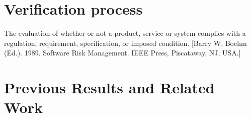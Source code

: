\section{Verification process}

The evaluation of whether or not a product, service or system complies with a regulation, requirement, specification, or imposed condition. [Barry W. Boehm (Ed.). 1989. Software Risk Management. IEEE Press, Piscataway, NJ, USA.]

\section{Previous Results and Related Work}
%